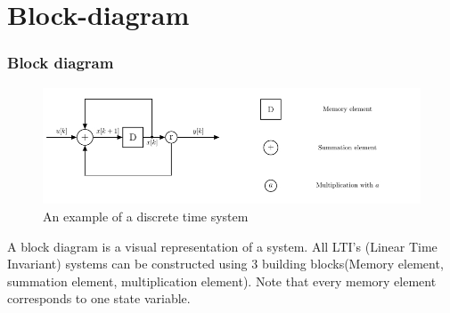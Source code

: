 \section{Block-diagram}
\begin{frame}
	\frametitle{Block diagram}
	\begin{figure}
		\centering
		\label{fig:discrete_time_systems_2}
		\includegraphics[width=0.75\linewidth]{Images/discrete_time_systems_2}
		\caption{An example of a discrete time system}
	\end{figure}
	\begin{definition}
			A block diagram is a visual representation of a system. All LTI’s (Linear Time Invariant) systems can be constructed using 3 building blocks(Memory element, summation element, multiplication element). Note that every memory element corresponds to one state variable.
	\end{definition}
\end{frame}
